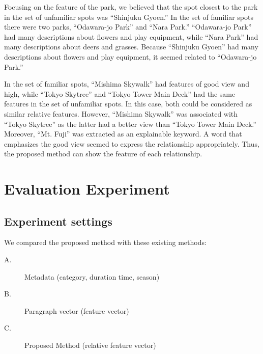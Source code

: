 \documentclass[journal]{IAENGtran}
\begin{document}
Focusing on the feature of the park, we believed that the spot closest to the park in the set of unfamiliar spots was ``Shinjuku Gyoen.''
In the set of familiar spots there were two parks, ``Odawara-jo Park'' and ``Nara Park.''
``Odawara-jo Park'' had many descriptions about flowers and play equipment, while ``Nara Park'' had many descriptions about deers and grasses.
Because ``Shinjuku Gyoen'' had many descriptions about flowers and play equipment, it seemed related to ``Odawara-jo Park.''

In the set of familiar spots, ``Mishima Skywalk'' had features of good view and high, while ``Tokyo Skytree'' and ``Tokyo Tower Main Deck'' had the same features in the set of unfamiliar spots.
In this case, both could be considered as similar relative features.
However, ``Mishima Skywalk'' was associated with ``Tokyo Skytree'' as the latter had a better view than ``Tokyo Tower Main Deck.''
Moreover, ``Mt. Fuji'' was extracted as an explainable keyword. A word that emphasizes the good view seemed to express the relationship appropriately.
Thus, the proposed method can show the feature of each relationship.


\section{Evaluation Experiment}
\label{sec:Evaluation Experiment}
\subsection{Experiment settings}
\label{subsec:Experiment settings}
We compared the proposed method with these existing methods:
\begin{description}
  \item[A.]Metadata (category, duration time, season)
  \item[B.]Paragraph vector (feature vector)
  \item[C.]Proposed Method (relative feature vector)
\end{description}
\end{document}
